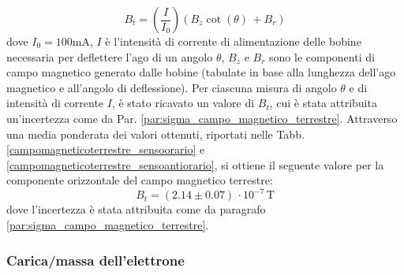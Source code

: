\documentclass[]{article}
\begin{document}
    \begin{equation}
        \label{mag_terr}
        B_t= \left(\frac{I}{I_0}\right) (B_z \cot(\theta) \, + B_r)
    \end{equation}
    dove $ I_0 = 100 \text{mA} $, $ I $ è l'intensità di corrente di alimentazione delle bobine necessaria per deflettere l'ago di un angolo $\theta $, $B_z$ e $B_r$ sono le componenti di campo magnetico generato dalle bobine (tabulate in base alla lunghezza dell'ago magnetico e all'angolo di deflessione). Per ciascuna misura di angolo $\theta$ e di intensità di corrente $I$, è stato ricavato un valore di $B_t$, cui è stata attribuita un'incertezza come da Par. \ref{par:sigma_campo_magnetico_terrestre}. 
    Attraverso una media ponderata dei valori ottenuti, riportati nelle Tabb. \ref{campomagneticoterrestre_sensoorario} e \ref{campomagneticoterrestre_sensoantiorario}, si ottiene il seguente valore per la componente orizzontale del campo magnetico terrestre:
    \begin{equation}
        \label{misura_campomagneticoterrestre}
        B_t = ( 2.14\pm 0.07) \, \cdot 10^{-7} \, \text{T}
    \end{equation}
    dove l'incertezza è stata attribuita come da paragrafo \ref{par:sigma_campo_magnetico_terrestre}. \\
    \label{par:campo_magnetico_terrestre}

    \subsubsection{Carica/massa dell'elettrone}
\end{document}

